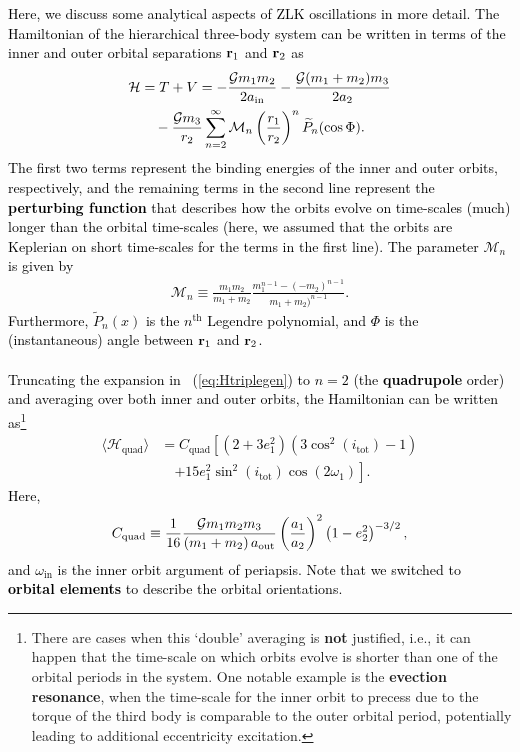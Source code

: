 \documentclass[main.tex]{subfiles}
\begin{document}
\begin{tcolorbox}[sharp corners, colback=green!30, colframe=green!80!blue, title=Box \refstepcounter{educhap3}\label{boxchap3:dynVI}\ref{boxchap3:dynVI} -- Orbital dynamics VI]
\par \textcolor{black}{Here, we discuss some analytical aspects of ZLK oscillations in more detail. The Hamiltonian of the hierarchical three-body system can be written in terms of the inner and outer orbital separations ${\mathbf{r}}_1$ and ${\mathbf{r}}_2$ as
\begin{align}
\label{eq:Htriplegen}
\nonumber \mathcal{H} &= T+V = - \frac{\mathcal{G} m_1m_2}{2a_\mathrm{in}} - \frac{\mathcal{G}(m_1+m_2)m_3}{2 a_2} \\
&\quad - \frac{\mathcal{G} m_3}{r_2} \sum_{n=2}^\infty \mathcal{M}_n \left ( \frac{r_1}{r_2} \right )^n \widetilde{P}_n(\cos \Phi).
\end{align}
The first two terms represent the binding energies of the inner and outer orbits, respectively, and the remaining terms in the second line represent the {\bf perturbing function} that describes how the orbits evolve on time-scales (much) longer than the orbital time-scales (here, we assumed that the orbits are Keplerian on short time-scales for the terms in the first line). The parameter $\mathcal{M}_n$ is given by
\begin{align}
\mathcal{M}_n \equiv \frac{m_1 m_2}{m_1+m_2}\frac{m_1^{n-1} - (-m_2)^{n-1}}{m_1+m_2)^{n-1}}.
\end{align}
Furthermore, $\widetilde{P}_n(x)$ is the $n^\mathrm{th}$ Legendre polynomial, and $\Phi$ is the (instantaneous) angle between ${\mathbf{r}}_1$ and ${\mathbf{r}}_2$. \\ \\
Truncating the expansion in \Eq~(\ref{eq:Htriplegen}) to $n=2$ (the {\bf quadrupole} order) and averaging over both inner and outer orbits, the Hamiltonian can be written as\footnote{There are cases when this `double' averaging is {\bf not} justified, i.e., it can happen that the time-scale on which orbits evolve is shorter than one of the orbital periods in the system. One notable example is the {\bf evection resonance}, when the time-scale for the inner orbit to precess due to the torque of the third body is comparable to the outer orbital period, potentially leading to additional eccentricity excitation. }
\begin{align}
\label{eq:Htriplequadav}
\nonumber \langle \mathcal{H}_\mathrm{quad}\rangle &= C_\mathrm{quad} \left [ \left (2 + 3 e_1^2 \right ) \left (3 \cos^2(i_\mathrm{tot}) - 1 \right ) \right. \\
&\quad \left. + 15 e_1^2 \sin^2(i_\mathrm{tot}) \cos(2\omega_1) \right ].
\end{align} 
Here, 
\begin{align}
C_\mathrm{quad} \equiv \frac{1}{16} \frac{\mathcal{G} m_1m_2m_3}{(m_1+m_2) \, a_\mathrm{out}} \left (\frac{a_1}{a_2} \right )^2 \left (1 - e_2^2 \right )^{-3/2},
\end{align}
and $\omega_\mathrm{in}$ is the inner orbit argument of periapsis. Note that we switched to {\bf orbital elements} to describe the orbital orientations. 
}  
\end{tcolorbox}
\end{document}
